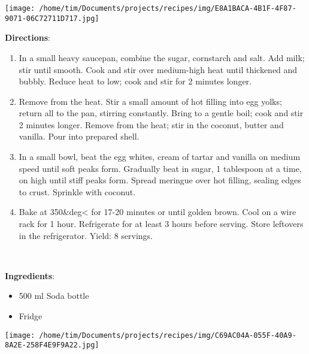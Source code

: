 \documentclass[11pt, twoside, openany]{book}
\begin{document}
\begin{minipage}[t]{0.2\linewidth}
\centering \strut\vspace*{-\baselineskip}\newline
\texttt{[image: /home/tim/Documents/projects/recipes/img/E8A1BACA-4B1F-4F87-9071-06C72711D717.jpg]}\\
\end{minipage}\vspace{3mm}
\textbf{Directions}:
\vspace{-3mm}\begin{enumerate}\setlength\itemsep{-1mm}
\item In a small heavy saucepan, combine the sugar, cornstarch and salt. Add milk; stir until smooth. Cook and stir over medium-high heat until thickened and bubbly. Reduce heat to low; cook and stir for 2 minutes longer. 
\item  Remove from the heat. Stir a small amount of hot filling into egg yolks; return all to the pan, stirring constantly. Bring to a gentle boil; cook and stir 2 minutes longer. Remove from the heat; stir in the coconut, butter and vanilla. Pour into prepared shell. 
\item  In a small bowl, beat the egg whites, cream of tartar and vanilla on medium speed until soft peaks form. Gradually beat in sugar, 1 tablespoon at a time, on high until stiff peaks form. Spread meringue over hot filling, sealing edges to crust. Sprinkle with coconut. 
\item  Bake at 350&deg< for 17-20 minutes or until golden brown. Cool on a wire rack for 1 hour. Refrigerate for at least 3 hours before serving. Store leftovers in the refrigerator. Yield: 8 servings.
\end{enumerate}
 \label{soda-slushie}\hfill\textit{}\\
\begin{minipage}[t]{0.8\linewidth}
\textbf{Ingredients}:\vspace{-3mm}
\begin{multicols}{2}
\begin{itemize}\setlength\itemsep{-1mm}
\item 500 ml Soda bottle
\item Fridge
\end{itemize}
\end{multicols}
\end{minipage}
\begin{minipage}[t]{0.2\linewidth}
\centering \strut\vspace*{-\baselineskip}\newline
\texttt{[image: /home/tim/Documents/projects/recipes/img/C69AC04A-055F-40A9-8A2E-258F4E9F9A22.jpg]}\\
\end{minipage}\vspace{3mm}
\end{document}
